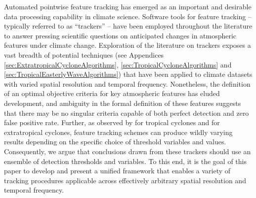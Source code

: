 \documentclass[gmdd, hvmath, online]{copernicus_discussions}
\begin{document}



\introduction  %

Automated pointwise feature tracking has emerged as an important and desirable data processing capability in climate science.  Software tools for feature tracking -- typically referred to as ``trackers'' -- have been employed throughout the literature to answer pressing scientific questions on anticipated changes in atmospheric features under climate change.  Exploration of the literature on trackers exposes a vast breadth of potential techniques (see Appendices \ref{sec:ExtratropicalCycloneAlgorithms}, \ref{sec:TropicalCycloneAlgorithms} and \ref{sec:TropicalEasterlyWaveAlgorithms}) that have been applied to climate datasets with varied spatial resolution and temporal frequency.  Nonetheless, the definition of an optimal objective criteria for key atmospheric features has eluded development, and ambiguity in the formal definition of these features suggests that there may be no singular criteria capable of both perfect detection and zero false positive rate.  Further, as observed by \cite{walsh2007objectively} for tropical cyclones and \cite{neu2013imilast} for extratropical cyclones, feature tracking schemes can produce wildly varying results depending on the specific choice of threshold variables and values.  Consequently, we argue that conclusions drawn from these trackers should use an ensemble of detection thresholds and variables.  To this end, it is the goal of this paper to develop and present a unified framework that enables a variety of tracking procedures applicable across effectively arbitrary spatial resolution and temporal frequency.
\end{document}
